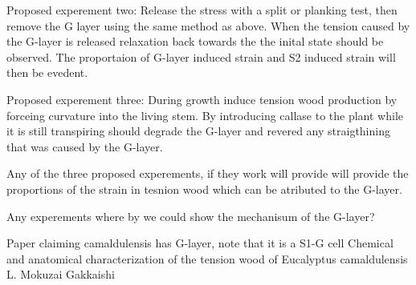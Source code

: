 \documentclass{article}
\begin{document}
Proposed experement two:
Release the stress with a split or planking test, then remove the G
layer using the same method as above. When the tension caused by the G-layer is
released relaxation back towards the the inital state should be observed. The
proportaion of G-layer induced strain and S2 induced strain will then be
evedent.

Proposed experement three:
During growth induce tension wood production by forceing curvature into the
living stem. By introducing callase to the plant while it is still transpiring
should degrade the G-layer and revered any straigthining that was caused by the
G-layer.

Any of the three proposed experements, if they work will provide will provide
the proportions of the strain in tesnion wood which can be atributed to the
G-layer.

Any experements where by we could show the mechanisum of the G-layer?

Paper claiming camaldulensis has G-layer, note that it is a S1-G cell
Chemical and anatomical characterization of the tension wood of Eucalyptus
camaldulensis L. Mokuzai Gakkaishi

\end{document}
